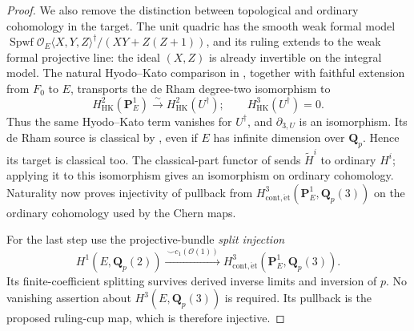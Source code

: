 \documentclass[11pt,a4paper]{article}
\theoremstyle{remark}
\newcommand{\Q}{\mathbf Q}
\newcommand{\PP}{\mathbf P}
\newcommand{\OO}{\mathcal O}
\begin{document}
\begin{proof}
We also remove the distinction between topological and ordinary
cohomology in the target. The unit quadric has the smooth weak formal
model
$\operatorname{Spwf}\OO_E\langle X,Y,Z\rangle^\dagger/
(XY+Z(Z+1))$, and its ruling extends to the weak formal projective
line: the ideal $(X,Z)$ is already invertible on the integral model.
The natural Hyodo--Kato comparison in
\cite[equation~(5.4) and the following strict quasi-isomorphism,
Propositions~5.5--5.6]{ColmezNiziol}, together with faithful extension
from $F_0$ to $E$, transports the de Rham degree-two isomorphism to
\[
 H^2_{\mathrm{HK}}(\PP^1_E)
       \xrightarrow{\sim}H^2_{\mathrm{HK}}(U^\dagger);
 \qquad H^3_{\mathrm{HK}}(U^\dagger)=0.
\]
Thus the same Hyodo--Kato term vanishes for $U^\dagger$, and
$\partial_{3,U}$ is an isomorphism.
Its de Rham source is classical by
\cite[Section~5.1]{ColmezNiziol}, even if $E$ has infinite dimension
over $\Q_p$. Hence its target is classical too.
The classical-part functor of \cite[Section~3.1.1]{ColmezNiziol}
sends $\widetilde H^i$ to ordinary $H^i$; applying it to this
isomorphism gives an isomorphism on ordinary cohomology.
Naturality now proves injectivity of pullback from
$H^3_{\mathrm{cont},\mathrm{\acute et}}(\PP^1_E,\Q_p(3))$ on the
ordinary cohomology used by the Chern maps.

For the last step use the projective-bundle \emph{split injection}
\[
 H^1(E,\Q_p(2))
 \xrightarrow{\ \smile c_1(\OO(1))\ }
 H^3_{\mathrm{cont},\mathrm{\acute et}}(\PP^1_E,\Q_p(3)).
\]
Its finite-coefficient splitting survives derived inverse limits and
inversion of $p$. No vanishing assertion about
$H^3(E,\Q_p(3))$ is required.
Its pullback is the proposed ruling-cup map, which is therefore
injective.
\end{proof}
\end{document}
